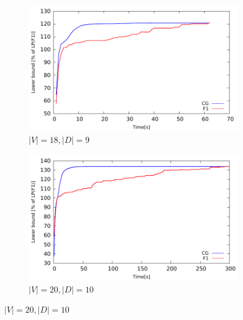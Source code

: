 \begin{figure}[!htb]
    \centering
    \begin{subfigure}[b]{0.49\textwidth}
        \includegraphics[width=\textwidth]{lower-bound-18-9}
        \caption{$|V|=18, |D|=9$}
        \label{fig:cggr18-9}
    \end{subfigure}
    \hfill %
    \begin{subfigure}[b]{0.49\textwidth}
        \includegraphics[width=\textwidth]{lower-bound-20-10}
        \caption{$|V|=20, |D|=10$}
        \label{fig:cggr20-10}
    \end{subfigure}
  

\end{figure}
